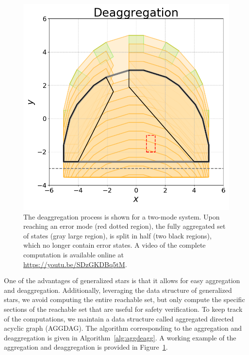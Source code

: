 \vspace{-0.7cm}
\begin{figure}[h!]
\centerline{\includegraphics[width=0.7\columnwidth]{images/deagg.png}}
\vspace{-0.4cm}
\caption{{\footnotesize The deaggregation process is shown for a two-mode system. Upon reaching an error mode (red dotted region), the fully aggregated set of states (gray large region), is split in half (two black regions), which no longer contain error states. A video of the complete computation is available online at \url{https://youtu.be/SDzGKDBq5tM}.}}
\label{fig:deagg}
\end{figure}
\vspace{-0.7cm}


One of the advantages of generalized stars is that it allows for easy aggregation and deaggregation. 
%
Additionally, leveraging the data structure of generalized stars, we avoid computing the entire reachable set, but only compute the specific sections of the reachable set that are useful for safety verification.
%
To keep track of the computations, we maintain a data structure called aggregated directed acyclic graph (AGGDAG).
%
The algorithm corresponding to the aggregation and deaggregation is given in Algorithm~\ref{alg:aggdeagg}. A working example of the aggregation and deaggregation is provided in Figure~\ref{fig:deagg}.

